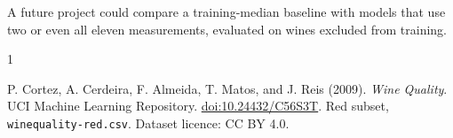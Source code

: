 \documentclass[10pt,a4paper]{article}
\begin{document}
A future project could compare a training-median
baseline with models that use two or even all eleven
measurements, evaluated on wines excluded from training.

\begin{thebibliography}{1}

    \setlength{\itemsep}{0pt}

    P. Cortez, A. Cerdeira, F. Almeida, T. Matos, and J. Reis (2009).
    \textit{Wine Quality}.
    UCI Machine Learning Repository.
    \href{https://doi.org/10.24432/C56S3T}
    {doi:10.24432/C56S3T}.
    Red subset, \texttt{winequality-red.csv}.
    Dataset licence: CC BY 4.0.

\end{thebibliography}
\end{document}
